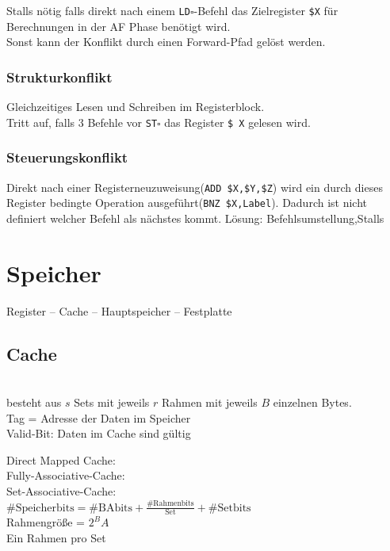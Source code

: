 \documentclass[fs]{latex4ei}
\begin{document}
\begin{multicols}{4}
	
	Stalls nötig falls direkt nach einem \texttt{LD$\square$}-Befehl das Zielregister \texttt{\$X} für Berechnungen in der AF Phase benötigt wird.\\
	Sonst kann der Konflikt durch einen Forward-Pfad gelöst werden.\\


	\subsubsection{Strukturkonflikt}
	Gleichzeitiges Lesen und Schreiben im Registerblock.\\
	Tritt auf, falls 3 Befehle vor \texttt{ST$\square$} das Register \texttt{\$ X} gelesen wird.\\
	
	
	\subsubsection{Steuerungskonflikt}
	Direkt nach einer Registerneuzuweisung(\texttt{ADD \$X,\$Y,\$Z}) wird ein durch dieses Register bedingte Operation ausgeführt(\texttt{BNZ \$X,Label}). 
	Dadurch ist nicht definiert welcher Befehl als nächstes kommt. Lösung: Befehlsumstellung,Stalls\\
	 

\section{Speicher}
Register -- Cache -- Hauptspeicher -- Festplatte\\


\subsection{Cache}
 \\
besteht aus $s$ Sets mit jeweils $r$ Rahmen mit jeweils $B$ einzelnen Bytes.\\
Tag = Adresse der Daten im Speicher\\
Valid-Bit: Daten im Cache sind gültig




Direct Mapped Cache:\\


Fully-Associative-Cache:\\



Set-Associative-Cache:\\
$\text{\#Speicherbits} = \text{\#BAbits} + \frac{\text{\#Rahmenbits}}{\text{Set}} + \text{\#Setbits}$ \\
Rahmengröße = $2^BA$\\
Ein Rahmen pro Set\\



\end{multicols}
\end{document}
